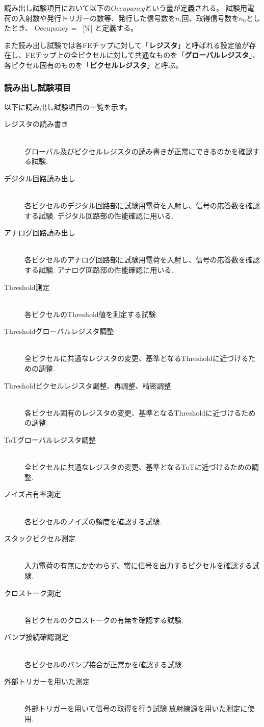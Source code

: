読み出し試験項目において以下の$Occupancy$という量が定義される。
試験用電荷の入射数や発行トリガーの数等、発行した信号数を$n_i$回、取得信号数を$n_0$としたとき、
\bbb
\label{occupancy}
Occupancy =  ~[\%]
\eee
と定義する。


また読み出し試験では各FEチップに対して「\textbf{レジスタ}」と呼ばれる設定値が存在し、FEチップ上の全ピクセルに対して共通なものを「\textbf{グローバルレジスタ}」、各ピクセル固有のものを「\textbf{ピクセルレジスタ}」と呼ぶ。

\clearpage
\subsubsection{読み出し試験項目}
以下に読み出し試験項目の一覧を示す。
\begin{description}
  \item[レジスタの読み書き]\mbox{}\\
グローバル及びピクセルレジスタの読み書きが正常にできるのかを確認する試験.
  \item[デジタル回路読み出し]\mbox{} \\
各ピクセルのデジタル回路部に試験用電荷を入射し、信号の応答数を確認する試験. デジタル回路部の性能確認に用いる.
  \item[アナログ回路読み出し]\mbox{}\\
各ピクセルのアナログ回路部に試験用電荷を入射し、信号の応答数を確認する試験. アナログ回路部の性能確認に用いる.
  \item[Threshold測定]\mbox{}\\
各ピクセルのThreshold値を測定する試験.
  \item[Thresholdグローバルレジスタ調整]\mbox{}\\
全ピクセルに共通なレジスタの変更、基準となるThresholdに近づけるための調整.
  \item[Thresholdピクセルレジスタ調整、再調整、精密調整]\mbox{}\\
各ピクセル固有のレジスタの変更、基準となるThresholdに近づけるための調整.
  \item[ToTグローバルレジスタ調整]\mbox{}\\
全ピクセルに共通なレジスタの変更、基準となるToTに近づけるための調整.
  \item[ノイズ占有率測定]\mbox{}\\
各ピクセルのノイズの頻度を確認する試験.
  \item[スタックピクセル測定]\mbox{}\\
入力電荷の有無にかかわらず、常に信号を出力するピクセルを確認する試験.
  \item[クロストーク測定]\mbox{}\\
各ピクセルのクロストークの有無を確認する試験.
  \item[バンプ接続確認測定]\mbox{}\\
各ピクセルのバンプ接合が正常かを確認する試験.
  \item[外部トリガーを用いた測定]\mbox{}\\
外部トリガーを用いて信号の取得を行う試験.放射線源を用いた測定に使用.
\end{description}

